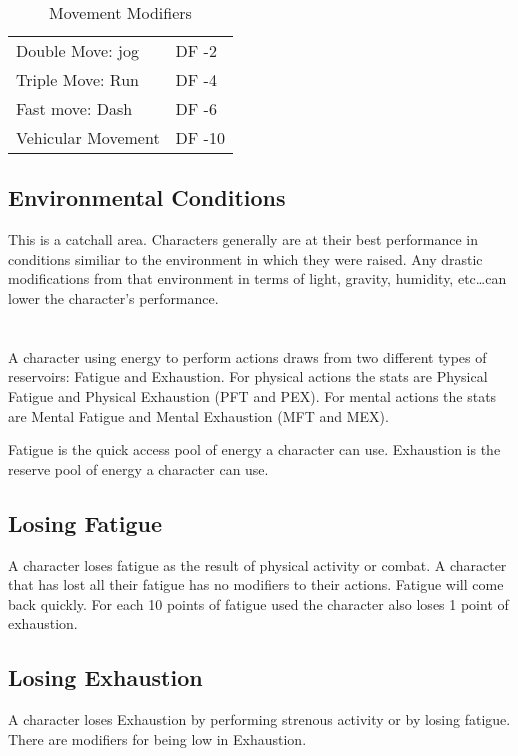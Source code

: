 \begin{table}[h]
	\begin{tabular}{ll}
	Double Move: jog							  & DF -2 \\
	Triple Move: Run							  & DF -4 \\
	Fast move: Dash							 & DF -6\\
	Vehicular Movement							& DF -10 \\ 
    \end{tabular}
    \caption{Movement Modifiers}
\end{table}

\subsection{Environmental Conditions}

This is a catchall area. Characters generally are at their best 
performance in conditions similiar to the environment in which they 
were raised. Any drastic modifications from that environment in 
terms of light, gravity, humidity, etc\dots can lower the character's 
performance.



\section{}

A character using energy to perform actions draws from two different 
types of reservoirs: Fatigue and Exhaustion. For physical actions the 
stats are Physical Fatigue and Physical Exhaustion (PFT and PEX). For mental
actions the stats are Mental Fatigue and Mental Exhaustion (MFT and MEX).

Fatigue is the quick access pool of energy a character can use.
Exhaustion is the reserve pool of energy a character can use. 

\subsection{Losing Fatigue}

A character loses fatigue as the result of physical activity or combat. 
A character that has lost all their fatigue has no modifiers to their actions.
Fatigue will come back quickly. For each 10 points of fatigue used the character 
also loses 1 point of exhaustion.

\subsection{Losing Exhaustion}
A character loses Exhaustion by performing strenous activity or by losing 
fatigue. There are modifiers for being low in Exhaustion.

